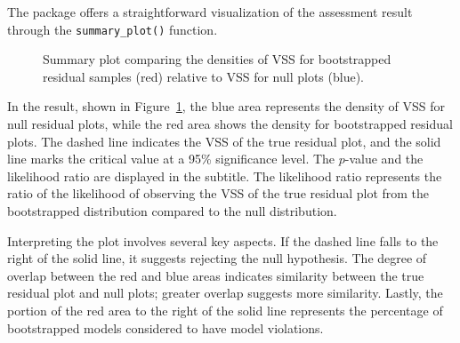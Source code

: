 \documentclass[
doublespace,
  times]{anzsauth}
\newenvironment{Shaded}{\begin{snugshade}}{\end{snugshade}}
\newcommand{\FunctionTok}[1]{\textcolor[rgb]{0.28,0.35,0.67}{#1}}
\newcommand{\NormalTok}[1]{\textcolor[rgb]{0.00,0.23,0.31}{#1}}
\newcommand{\SpecialCharTok}[1]{\textcolor[rgb]{0.37,0.37,0.37}{#1}}
\begin{document}
The package offers a straightforward visualization of the assessment
result through the \texttt{summary\_plot()} function.

\begin{Shaded}
\end{Shaded}

\begin{figure}[H]


\caption{\label{fig-summary-plot}Summary plot comparing the densities of
VSS for bootstrapped residual samples (red) relative to VSS for null
plots (blue).}

\end{figure}%

In the result, shown in Figure~\ref{fig-summary-plot}, the blue area
represents the density of VSS for null residual plots, while the red
area shows the density for bootstrapped residual plots. The dashed line
indicates the VSS of the true residual plot, and the solid line marks
the critical value at a 95\% significance level. The \(p\)-value and the
likelihood ratio are displayed in the subtitle. The likelihood ratio
represents the ratio of the likelihood of observing the VSS of the true
residual plot from the bootstrapped distribution compared to the null
distribution.

Interpreting the plot involves several key aspects. If the dashed line
falls to the right of the solid line, it suggests rejecting the null
hypothesis. The degree of overlap between the red and blue areas
indicates similarity between the true residual plot and null plots;
greater overlap suggests more similarity. Lastly, the portion of the red
area to the right of the solid line represents the percentage of
bootstrapped models considered to have model violations.
\end{document}
